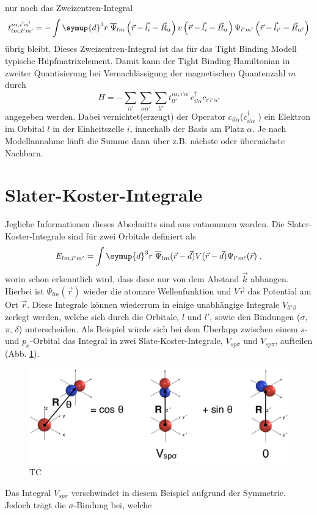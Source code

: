 nur noch das Zweizentren-Integral 
\begin{equation*} 
    t^{i\alpha,i'\alpha'}_{lm,l'm'} = - \int \symup{d}^3r \; \overline{\Psi}_{lm} \left (\vec{r}-\vec{l}_i - \vec{R}_{\alpha} \right ) 
    v \left ( \vec{r} - \vec{l}_{i} - \vec{R}_{\alpha} \right ) \Psi_{l'm'} \left (\vec{r}-\vec{l}_{i'} - \vec{R}_{\alpha'} \right ) 
\end{equation*}
übrig bleibt.\cite{SC_literature}
Dieses Zweizentren-Integral ist das für das Tight Binding Modell typische Hüpfmatrixelement.
Damit kann der Tight Binding Hamiltonian in zweiter Quantisierung bei Vernachlässigung der 
magnetischen Quantenzahl $m$ durch
\begin{equation}
    H = - \sum_{ii'} \sum_{\alpha \alpha'}\sum_{ll'} t^{i\alpha,i'\alpha'}_{ll'}  c_{il\alpha}^\dagger c_{i'l'\alpha'}  \label{eqn:tight-binding-hamiltonian}
\end{equation}
angegeben werden.\cite{anders-fkt}
Dabei vernichtet(erzeugt) der Operator $c_{il\alpha}$($c_{il\alpha}^{\dagger}$ ) ein Elektron im Orbital $l$ in der Einheitszelle $i$,
innerhalb der Basis am Platz $\alpha$.
Je nach Modellannahme läuft die Summe dann über z.B. nächste oder übernächste Nachbarn.
\section{Slater-Koster-Integrale}
Jegliche Informationen dieses Abschnitts sind aus \cite{SC_literature} entnommen worden.
Die Slater-Koster-Integrale sind für zwei Orbitale definiert als
\begin{equation}
    E_{lm,l'm'} = \int \symup{d}^3r \; \overline{\Psi}_{lm} (\vec{r}-\vec{d})
    V(\vec{r} - \vec{d}) \Psi_{l'm'} (\vec{r}) \; ,
\end{equation}
worin schon erkenntlich wird, dass diese nur von dem Abstand $\vec{k}$ abhängen.
Hierbei ist $\Psi_{lm}(\vec{r})$ wieder die atomare Wellenfunktion und $V\vec{r}$ das Potential am Ort $\vec{r}$.  
Diese Integrale können wiederrum in einige unabhängige Integrale $V_{ll'\beta}$ zerlegt werden, welche sich durch die Orbitale, $l$ und $l'$, sowie den Bindungen ($\sigma$, $\pi$, $\delta$) unterscheiden.
Als Beispiel würde sich bei dem Überlapp zwischen einem $s$- und $p_x$-Orbital das Integral in zwei 
Slate-Koster-Integrale, $V_{sp\sigma}$ und $V_{sp\pi}$, aufteilen (Abb. \ref{fig:TC}).
\begin{figure}
    \centering
    \includegraphics[width = 0.85 \textwidth]{Plots/tc.png}
    \caption{TC}
    \label{fig:TC}
\end{figure}
Das Integral $V_{sp\pi}$ verschwindet in diesem Beispiel aufgrund der Symmetrie.
Jedoch trägt die $\sigma$-Bindung bei, welche